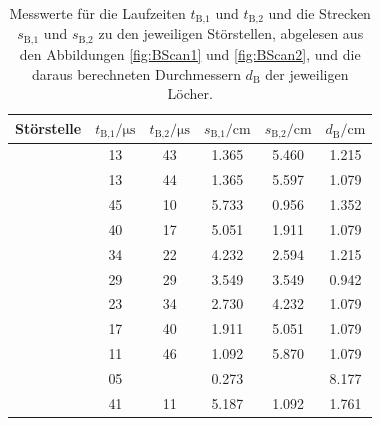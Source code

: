 \begin{table}[h]
  \centering
  \begin{tabular}{S S S S S S}
    \toprule
    {Störstelle} & {$t_\text{B,1}/\si{\micro\second}$} & {$t_\text{B,2}/
    \si{\micro\second}$} & {$s_\text{B,1}/\si{\centi\meter}$} & {$s_\text{B,2}/
    \si{\centi\meter}$} & {$d_\text{B}/\si{\centi\meter}$} \\
    \midrule
     & 13 & 43 & 1.365 & 5.460 & 1.215 \\
     & 13 & 44 & 1.365 & 5.597 & 1.079 \\
     & 45 & 10 & 5.733 & 0.956 & 1.352 \\
     & 40 & 17 & 5.051 & 1.911 & 1.079 \\
     & 34 & 22 & 4.232 & 2.594 & 1.215 \\
     & 29 & 29 & 3.549 & 3.549 & 0.942 \\
     & 23 & 34 & 2.730 & 4.232 & 1.079 \\
     & 17 & 40 & 1.911 & 5.051 & 1.079 \\
     & 11 & 46 & 1.092 & 5.870 & 1.079 \\
     & 05 & \text{ } & 0.273 & \text{ } & 8.177 \\
     & 41 & 11 & 5.187 & 1.092 & 1.761 \\
    \bottomrule
  \end{tabular}
  \caption{Messwerte für die Laufzeiten $t_\text{B,1}$ und $t_\text{B,2}$ und
  die Strecken $s_\text{B,1}$ und $s_\text{B,2}$ zu den jeweiligen
  Störstellen, abgelesen aus den Abbildungen \ref{fig:BScan1} und
  \ref{fig:BScan2}, und die daraus berechneten Durchmessern $d_\text{B}$
  der jeweiligen
  Löcher.}
  \label{tab:BScanZeitenStreckenDicken}
\end{table}
